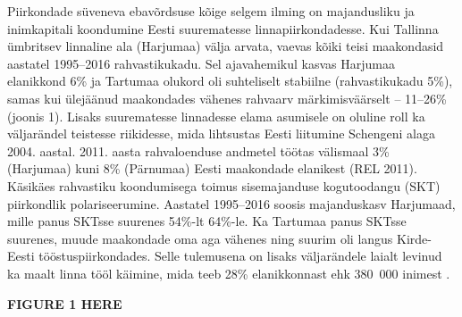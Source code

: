\documentclass[]{book}
\begin{document}
Piirkondade süveneva ebavõrdsuse kõige selgem ilming on majandusliku ja inimkapitali koondumine Eesti
suurematesse linnapiirkondadesse. Kui Tallinna ümbritsev linnaline ala (Harjumaa) välja arvata, vaevas kõiki
teisi maakondasid aastatel 1995--2016 rahvastikukadu. Sel ajavahemikul kasvas Harjumaa elanikkond 6\% ja
Tartumaa olukord oli suhteliselt stabiilne (rahvastikukadu 5\%), samas kui ülejäänud maakondades vähenes
rahvaarv märkimisväärselt -- 11--26\% (joonis 1). Lisaks suurematesse linnadesse elama asumisele on oluline
roll ka väljarändel teistesse riikidesse, mida lihtsustas Eesti liitumine Schengeni alaga 2004. aastal. 2011.
aasta rahvaloenduse andmetel töötas välismaal 3\% (Harjumaa) kuni 8\% (Pärnumaa) Eesti maakondade
elanikest (REL 2011). Käsikäes rahvastiku koondumisega toimus sisemajanduse kogutoodangu (SKT)
piirkondlik polariseerumine. Aastatel 1995--2016 soosis majanduskasv Harjumaad, mille panus SKTsse
suurenes 54\%-lt 64\%-le. Ka Tartumaa panus SKTsse suurenes, muude maakondade oma aga vähenes ning
suurim oli langus Kirde-Eesti tööstuspiirkondades. Selle tulemusena on lisaks väljarändele laialt levinud ka
maalt linna tööl käimine, mida teeb 28\% elanikkonnast ehk 380~000 inimest \citep{pendelranne}.

\textbf{FIGURE 1 HERE}
\end{document}
